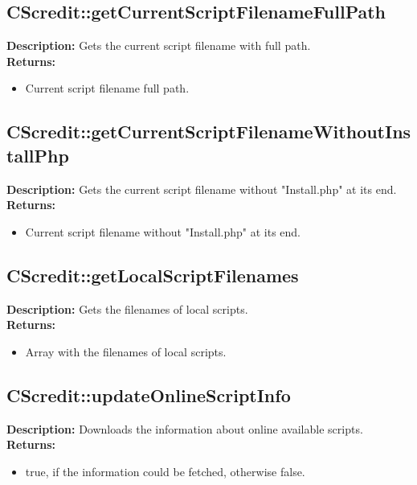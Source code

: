 \subsection{CScredit::getCurrentScriptFilenameFullPath}
\textbf{Description:} Gets the current script filename with full path.\\
\textbf{Returns:}
\begin{itemize}
\item Current script filename full path.
\end{itemize}

\subsection{CScredit::getCurrentScriptFilenameWithoutInstallPhp}
\textbf{Description:} Gets the current script filename without "Install.php" at its end.\\
\textbf{Returns:}
\begin{itemize}
\item Current script filename without "Install.php" at its end.
\end{itemize}

\subsection{CScredit::getLocalScriptFilenames}
\textbf{Description:} Gets the filenames of local scripts.\\
\textbf{Returns:}
\begin{itemize}
\item Array with the filenames of local scripts.
\end{itemize}

\subsection{CScredit::updateOnlineScriptInfo}
\textbf{Description:} Downloads the information about online available scripts.\\
\textbf{Returns:}
\begin{itemize}
\item true, if the information could be fetched, otherwise false.
\end{itemize}

